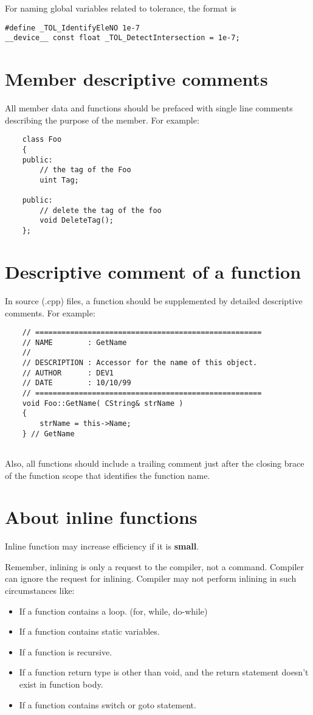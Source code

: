 \documentclass{article}
\begin{document}
For naming global variables related to tolerance, the format is
\begin{lstlisting}
#define _TOL_IdentifyEleNO 1e-7
__device__ const float _TOL_DetectIntersection = 1e-7;
\end{lstlisting}

\section{Member descriptive comments}
All member data and functions should be prefaced with single line comments describing the purpose of the member. For example:
\begin{lstlisting}
	class Foo
	{
	public:
		// the tag of the Foo
		uint Tag;
	
	public:
		// delete the tag of the foo
		void DeleteTag();
	};
\end{lstlisting}

\section{Descriptive comment of a function}
In source (.cpp) files, a function should be supplemented by detailed descriptive comments. For example:
\begin{lstlisting}
	// ====================================================
	// NAME	       : GetName
	//
	// DESCRIPTION : Accessor for the name of this object.
	// AUTHOR	   : DEV1
	// DATE	       : 10/10/99
	// ====================================================
	void Foo::GetName( CString& strName )
	{
		strName = this->Name;
	} // GetName	
	
\end{lstlisting}
	Also, all functions should include a trailing comment just after the closing brace of the function scope that identifies the function name.

\section{About inline functions}
	Inline function may increase efficiency if it is \textbf{small}.
	
	Remember, inlining is only a request to the compiler, not a command. Compiler can ignore the request for inlining. Compiler may not perform inlining in such circumstances like:
	\begin{itemize}
	\item If a function contains a loop. (for, while, do-while)
	\item If a function contains static variables.
	\item If a function is recursive.
	\item If a function return type is other than void, and the return statement doesn’t exist in function body.
	\item If a function contains switch or goto statement.	
	\end{itemize}
\end{document}
